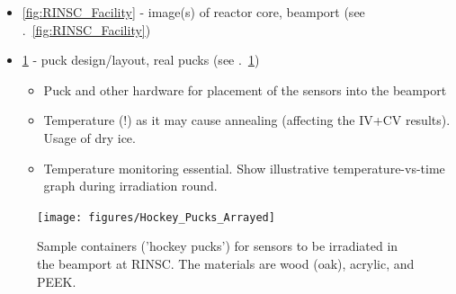 \begin{itemize}
    \item \ref{fig:RINSC_Facility} - image(s) of reactor core, beamport (see .~\ref{fig:RINSC_Facility})
    \item \ref{fig:Pucks_Arrayed} - puck design/layout, real pucks (see .~\ref{fig:Pucks_Arrayed})
    \begin{itemize}
  \item Puck and other hardware for placement of the sensors into the beamport
  \item Temperature (!) as it may cause annealing (affecting the IV+CV results). Usage of dry ice.
  \item Temperature monitoring essential. Show illustrative temperature-vs-time graph during irradiation round. 
\end{itemize}
\end{itemize}

\begin{figure}[!hbt]
  \begin{center}
    \texttt{[image: figures/Hockey\_Pucks\_Arrayed]}
    \caption{Sample containers ('hockey pucks') for sensors to be irradiated in the beamport at RINSC. The materials are wood (oak), acrylic, and PEEK.}
    \label{fig:Pucks_Arrayed}
  \end{center}
\end{figure}

\fi
